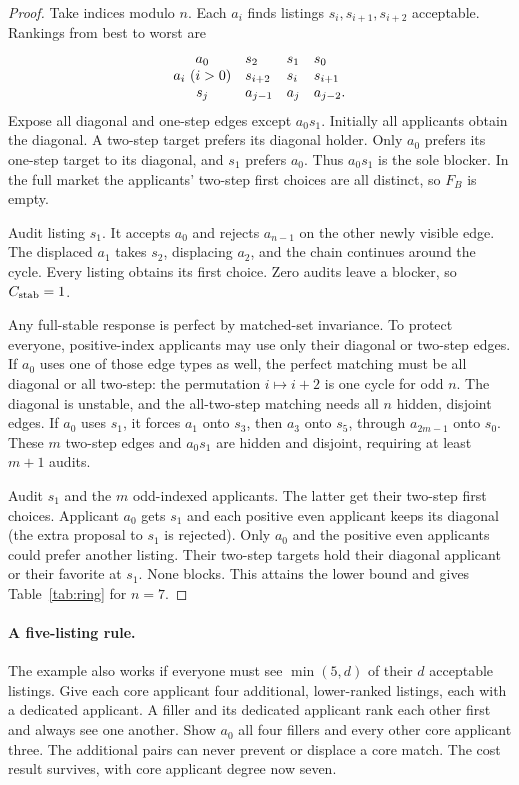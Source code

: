 \begin{proof}
Take indices modulo $n$. Each $a_i$ finds listings $s_i,s_{i+1},s_{i+2}$ acceptable. Rankings from best to worst are
\[
\begin{array}{c@{\quad}lll}
 a_0 & s_2 & s_1 & s_0\\
 a_i\ (i>0)& s_{i+2}&s_i&s_{i+1}\\
 s_j & a_{j-1}&a_j&a_{j-2}.
\end{array}
\]
Expose all diagonal and one-step edges except $a_0s_1$. Initially all applicants obtain the diagonal. A two-step target prefers its diagonal holder. Only $a_0$ prefers its one-step target to its diagonal, and $s_1$ prefers $a_0$. Thus $a_0s_1$ is the sole blocker. In the full market the applicants' two-step first choices are all distinct, so $F_B$ is empty.

Audit listing $s_1$. It accepts $a_0$ and rejects $a_{n-1}$ on the other newly visible edge. The displaced $a_1$ takes $s_2$, displacing $a_2$, and the chain continues around the cycle. Every listing obtains its first choice. Zero audits leave a blocker, so $C_{\mathrm{stab}}=1$.

Any full-stable response is perfect by matched-set invariance. To protect everyone, positive-index applicants may use only their diagonal or two-step edges. If $a_0$ uses one of those edge types as well, the perfect matching must be all diagonal or all two-step: the permutation $i\mapsto i+2$ is one cycle for odd $n$. The diagonal is unstable, and the all-two-step matching needs all $n$ hidden, disjoint edges. If $a_0$ uses $s_1$, it forces $a_1$ onto $s_3$, then $a_3$ onto $s_5$, through $a_{2m-1}$ onto $s_0$. These $m$ two-step edges and $a_0s_1$ are hidden and disjoint, requiring at least $m+1$ audits.

Audit $s_1$ and the $m$ odd-indexed applicants. The latter get their two-step first choices. Applicant $a_0$ gets $s_1$ and each positive even applicant keeps its diagonal (the extra proposal to $s_1$ is rejected). Only $a_0$ and the positive even applicants could prefer another listing. Their two-step targets hold their diagonal applicant or their favorite at $s_1$. None blocks. This attains the lower bound and gives Table~\ref{tab:ring} for $n=7$.
\end{proof}

\paragraph{A five-listing rule.}
The example also works if everyone must see $\min(5,d)$ of their $d$ acceptable listings. Give each core applicant four additional, lower-ranked listings, each with a dedicated applicant. A filler and its dedicated applicant rank each other first and always see one another. Show $a_0$ all four fillers and every other core applicant three. The additional pairs can never prevent or displace a core match. The cost result survives, with core applicant degree now seven.

